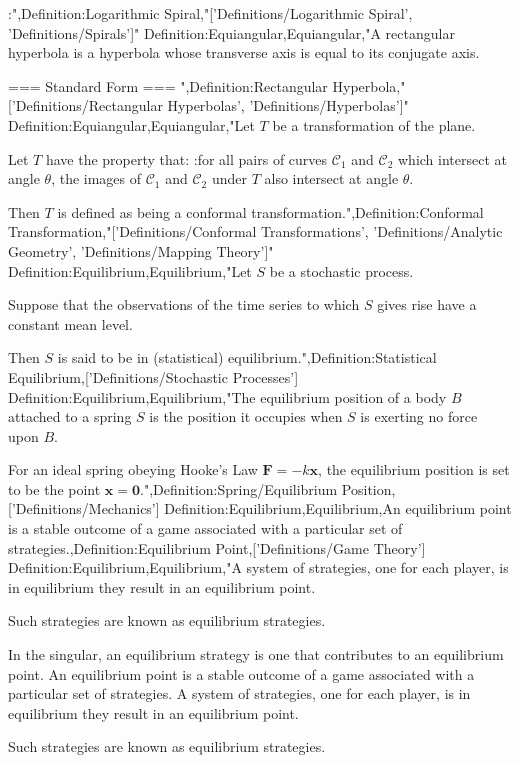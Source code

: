 :",Definition:Logarithmic Spiral,"['Definitions/Logarithmic Spiral', 'Definitions/Spirals']"
Definition:Equiangular,Equiangular,"A rectangular hyperbola is a hyperbola whose transverse axis is equal to its conjugate axis.


=== Standard Form ===
",Definition:Rectangular Hyperbola,"['Definitions/Rectangular Hyperbolas', 'Definitions/Hyperbolas']"
Definition:Equiangular,Equiangular,"Let $T$ be a transformation of the plane.

Let $T$ have the property that:
:for all pairs of curves $\mathcal C_1$ and $\mathcal C_2$ which intersect at angle $\theta$, the images of $\mathcal C_1$ and $\mathcal C_2$ under $T$ also intersect at angle $\theta$.

Then $T$ is defined as being a conformal transformation.",Definition:Conformal Transformation,"['Definitions/Conformal Transformations', 'Definitions/Analytic Geometry', 'Definitions/Mapping Theory']"
Definition:Equilibrium,Equilibrium,"Let $S$ be a stochastic process.

Suppose that the observations of the time series to which $S$ gives rise have a constant mean level.

Then $S$ is said to be in (statistical) equilibrium.",Definition:Statistical Equilibrium,['Definitions/Stochastic Processes']
Definition:Equilibrium,Equilibrium,"The equilibrium position of a body $B$ attached to a spring $S$ is the position it occupies when $S$ is exerting no force upon $B$.

For an ideal spring obeying Hooke's Law $\mathbf F = -k \mathbf x$, the equilibrium position is set to be the point $\mathbf x = \boldsymbol 0$.",Definition:Spring/Equilibrium Position,['Definitions/Mechanics']
Definition:Equilibrium,Equilibrium,An equilibrium point is a stable outcome of a game associated with a particular set of strategies.,Definition:Equilibrium Point,['Definitions/Game Theory']
Definition:Equilibrium,Equilibrium,"A system of strategies, one for each player, is in equilibrium  they result in an equilibrium point.

Such strategies are known as equilibrium strategies.


In the singular, an equilibrium strategy is one that contributes to an equilibrium point.
An equilibrium point is a stable outcome of a game associated with a particular set of strategies.
A system of strategies, one for each player, is in equilibrium  they result in an equilibrium point.

Such strategies are known as equilibrium strategies.


